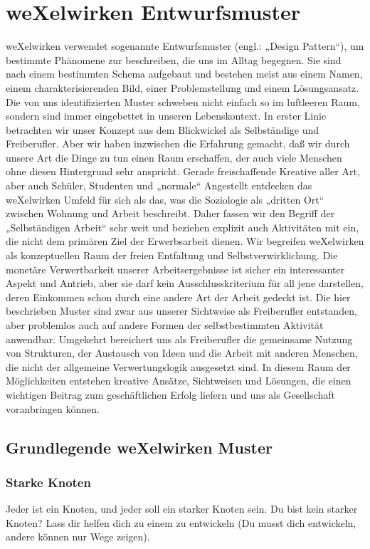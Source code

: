 {  \section{weXelwirken Entwurfsmuster}
weXelwirken  verwendet  sogenannte  Entwurfsmuster (engl.:  „Design  Pattern“),  um  bestimmte Phänomene zur beschreiben, die uns im Alltag begegnen.
%
Sie sind nach einem bestimmten Schema aufgebaut  und  bestehen  meist  aus  einem  Namen,  einem  charakterisierenden  Bild,  einer Problemstellung und einem Lösungsansatz.
%
Die von uns identifizierten Muster schweben nicht einfach so im luftleeren Raum, sondern sind immer eingebettet  in  unseren  Lebenskontext.
%
 In  erster  Linie  betrachten  wir  unser  Konzept  aus  dem Blickwickel als Selbständige und Freiberufler.
%
Aber wir haben inzwischen die Erfahrung gemacht, daß wir durch unsere Art die Dinge zu tun einen Raum erschaffen, der auch viele Menschen ohne diesen 
Hintergrund sehr anspricht.
%
 Gerade freischaffende Kreative aller Art, aber auch Schüler, Studenten und „normale“ Angestellt entdecken das weXelwirken Umfeld für sich als das, was die Soziologie als „dritten Ort“ zwischen Wohnung und Arbeit beschreibt.
%
Daher fassen wir den Begriff der „Selbständigen Arbeit“ sehr weit und beziehen explizit auch Aktivitäten mit ein, die nicht dem primären Ziel der Erwerbsarbeit dienen.
%
Wir begreifen weXelwirken als konzeptuellen Raum der freien Entfaltung und Selbstverwirklichung.
%
 Die monetäre Verwertbarkeit unserer  Arbeitsergebnisse  ist  sicher  ein  interessanter  Aspekt  und  Antrieb,  aber  sie  darf  kein 
Ausschlusskriterium für all jene darstellen, deren Einkommen schon durch eine andere Art der Arbeit gedeckt ist.
%
Die hier beschrieben Muster sind zwar aus unserer Sichtweise als Freiberufler entstanden, aber problemlos auch auf andere Formen der selbstbestimmten Aktivität anwendbar. 
%
Umgekehrt bereichert uns als Freiberufler die gemeinsame Nutzung von Strukturen, der Austausch von Ideen und die Arbeit mit anderen Menschen, die nicht der allgemeine Verwertungslogik ausgesetzt sind.
%
In diesem Raum der Möglichkeiten entstehen kreative Ansätze, Sichtweisen und Lösungen, die einen wichtigen Beitrag zum geschäftlichen Erfolg liefern und uns als Gesellschaft voranbringen können.


\subsection{Grundlegende weXelwirken Muster}
    \subsubsection{Starke Knoten}
Jeder ist ein Knoten, und jeder soll ein starker Knoten sein.
%
Du bist kein starker Knoten?
%
Lass dir helfen dich zu einem zu entwickeln (Du musst dich entwickeln, andere können nur Wege zeigen).
}
